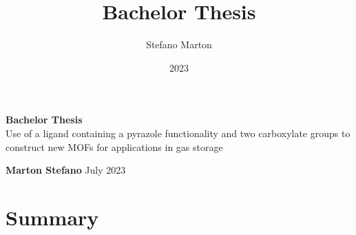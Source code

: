 \documentclass[a4,11pt]{report}
\title{Bachelor Thesis}
\author{Stefano Marton}
\date{2023}
\begin{document}
\begin{titlepage}
	\begin{center}
		\vspace*{6cm}
		\Huge
		\textbf{Bachelor Thesis}\\
		\vspace{0.5cm}
		\LARGE
		\vspace{1.5cm}
		Use of a ligand containing a pyrazole functionality and two carboxylate groups to construct new MOFs for applications in gas storage

		\vspace{1.5cm}
		\textbf{Marton Stefano}
		\vfill
		July 2023
		\vspace{0.8cm}
	\end{center}
\end{titlepage}
\vspace{1cm}

\chapter*{Summary}
\end{document}
